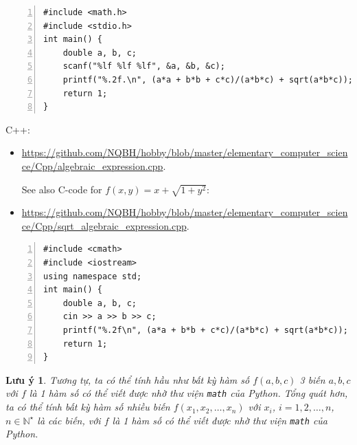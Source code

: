 \documentclass{article}
\newtheorem{luuy}{Lưu ý}
\begin{document}
\begin{Verbatim}[numbers=left,xleftmargin=5mm]
#include <math.h>
#include <stdio.h>
int main() {
    double a, b, c;
    scanf("%lf %lf %lf", &a, &b, &c);
    printf("%.2f.\n", (a*a + b*b + c*c)/(a*b*c) + sqrt(a*b*c));
    return 1;
}
\end{Verbatim}
C++:
\begin{itemize}
	\item \url{https://github.com/NQBH/hobby/blob/master/elementary_computer_science/Cpp/algebraic_expression.cpp}.
	
	See also C-code for $f(x,y) = x + \sqrt{1 + y^2}$:
	\item \url{https://github.com/NQBH/hobby/blob/master/elementary_computer_science/Cpp/sqrt_algebraic_expression.cpp}.
\end{itemize}
\begin{Verbatim}[numbers=left,xleftmargin=5mm]
#include <cmath>
#include <iostream>
using namespace std;
int main() {
    double a, b, c;
    cin >> a >> b >> c;
    printf("%.2f\n", (a*a + b*b + c*c)/(a*b*c) + sqrt(a*b*c));
    return 1;
}
\end{Verbatim}

\begin{luuy}
	Tương tự, ta có thể tính hầu như bất kỳ hàm số $f(a,b,c)$ 3 biến $a,b,c$ với $f$ là 1 hàm số có thể viết được nhờ thư viện {\tt math} của Python. Tổng quát hơn, ta có thể tính bất kỳ hàm số nhiều biến $f(x_1,x_2,\ldots,x_n)$ với $x_i$, $i = 1,2,\ldots,n$, $n\in\mathbb{N}^\star$ là các biến, với $f$ là 1 hàm số có thể viết được nhờ thư viện {\tt math} của Python.
\end{luuy}
\end{document}
